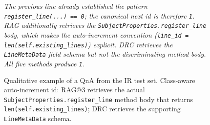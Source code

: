 \documentclass[11pt]{article}
\begin{document}
\begin{figure}[!htbp]
\begin{center}
\begin{tcolorbox}
\vspace{1pt}
{\footnotesize\itshape\color{black!55}
The previous line already established the pattern \texttt{register\_line(...) == 0}; the canonical next id is therefore \texttt{1}. RAG additionally retrieves the \texttt{SubjectProperties.register\_line} body, which makes the auto-increment convention (\texttt{line\_id = len(self.existing\_lines)}) explicit. DRC retrieves the \texttt{LineMetaData} field schema but not the discriminating method body. All five methods produce \texttt{1}.
}

\end{tcolorbox}
\caption{Qualitative example of a QnA from the IR test set. Class-aware auto-increment id: RAG@3 retrieves the actual \texttt{SubjectProperties.register\_line} method body that returns \texttt{len(self.existing\_lines)}; DRC retrieves the supporting \texttt{LineMetaData} schema.}
\label{fig:qualitative_ir_pynguin_68}
\end{center}
\end{figure}
\end{document}
